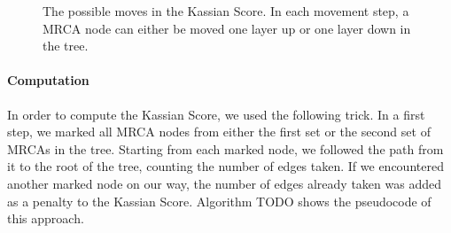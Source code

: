 \documentclass{llncs}
\begin{document}
\begin{figure}[H!]
\centering
{} 

   
\caption{The possible moves in the Kassian Score. In each movement step, a MRCA node can either be moved one layer up or one layer down in the tree.}
\label{fig:movements}
\end{figure}

\paragraph{Computation}
In order to compute the Kassian Score, we used the following trick. In a first step, we marked all MRCA nodes from either the first set or the second set of MRCAs in the tree. Starting from each marked node, we followed the path from it to the root of the tree, counting the number of edges taken. If we encountered another marked node on our way, the number of edges already taken was added as a penalty to the Kassian Score. Algorithm TODO shows the pseudocode of this approach.



\end{document}
